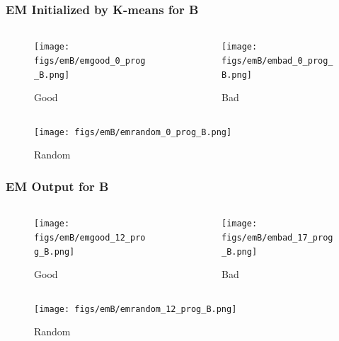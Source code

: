 \documentclass[11pt]{beamer}
\begin{document}
\begin{frame}
\frametitle{EM Initialized by K-means for B}
\begin{columns}[onlytextwidth]
\begin{column}{.45\textwidth}
\begin{figure}
  \texttt{[image: figs/emB/emgood\_0\_prog\_B.png]}
  \caption{Good}
\end{figure}
\end{column}
\hfill
\begin{column}{.45\textwidth}
\begin{figure}
  \texttt{[image: figs/emB/embad\_0\_prog\_B.png]}
  \caption{Bad}
\end{figure}
\end{column}
\end{columns}\vfill

\begin{figure}
  \texttt{[image: figs/emB/emrandom\_0\_prog\_B.png]}
  \caption{Random}
\end{figure}
\end{frame}


\begin{frame}
\frametitle{EM Output for B}
\begin{columns}[onlytextwidth]
\begin{column}{.45\textwidth}
\begin{figure}
  \texttt{[image: figs/emB/emgood\_12\_prog\_B.png]}
  \caption{Good}
\end{figure}
\end{column}
\hfill
\begin{column}{.45\textwidth}
\begin{figure}
  \texttt{[image: figs/emB/embad\_17\_prog\_B.png]}
  \caption{Bad}
\end{figure}
\end{column}
\end{columns}\vfill

\begin{figure}
  \texttt{[image: figs/emB/emrandom\_12\_prog\_B.png]}
  \caption{Random}
\end{figure}
\end{frame}
\end{document}
